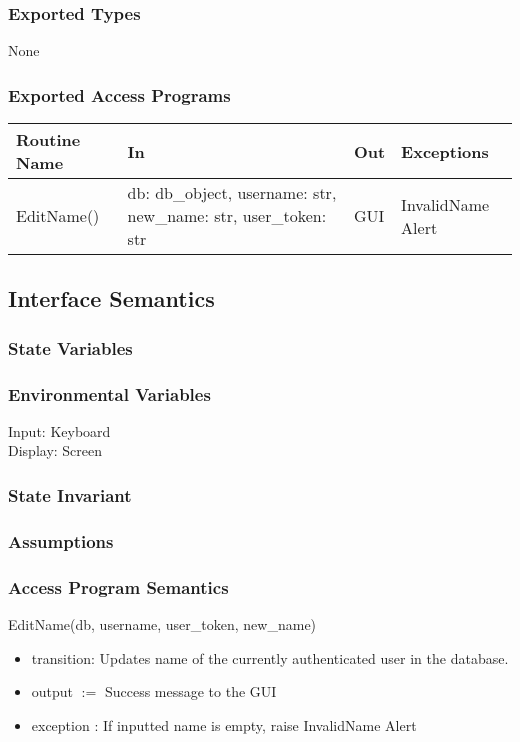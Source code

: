 \documentclass[12pt, titlepage]{article}
\begin{document}
\subsubsection* {Exported Types}
None

\subsubsection* {Exported Access Programs}
\begin{table}[!htb]
    \centering
    \begin{tabular}{|p{3cm}|p{3cm}|p{3cm}|p{4.5cm}|}
        \hline
        \textbf{Routine Name} & \textbf{In} & \textbf{Out} & \textbf{Exceptions} \\
        \hline
         EditName() & db: db\_object, username: str, new\_name: str, user\_token: str  & GUI & InvalidName Alert\\
        \hline
    \end{tabular}
\end{table}

\subsection{Interface Semantics}
\subsubsection{State Variables}

\subsubsection{Environmental Variables}
Input: Keyboard\\
Display: Screen

\subsubsection{State Invariant}

\subsubsection{Assumptions}

\subsubsection{Access Program Semantics}
EditName(db, username, user\_token, new\_name)
\begin{itemize}
    \item transition: Updates name of the currently authenticated user in the database.
    \item output $:= $ Success message to the GUI
    \item exception : If inputted name is empty, raise InvalidName Alert
\end{itemize}
\end{document}
